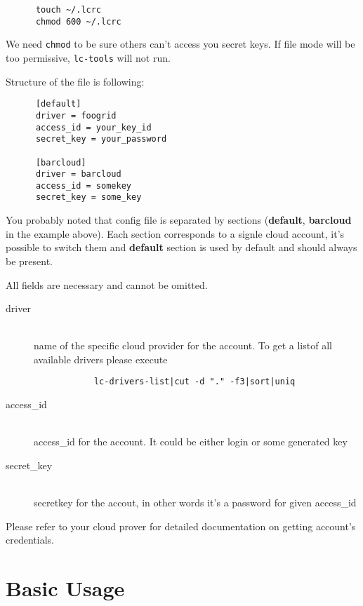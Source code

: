 \documentclass[a4paper]{report}
\begin{document}
      \begin{verbatim}
      touch ~/.lcrc
      chmod 600 ~/.lcrc
      \end{verbatim}

      We need {\tt chmod} to be sure others can't access you secret keys. If file mode
      will be too permissive, {\tt lc-tools} will not run.

      Structure of the file is following:

      \begin{verbatim}
      [default]
      driver = foogrid
      access_id = your_key_id
      secret_key = your_password

      [barcloud]
      driver = barcloud
      access_id = somekey
      secret_key = some_key
      \end{verbatim}

      You probably noted that config file is separated by sections (\textbf{default},
      \textbf{barcloud} in the example above). Each section corresponds to a signle
      cloud account, it's possible to switch them and \textbf{default} section is
      used by default and should always be present.

      All fields are necessary and cannot be omitted.

      \begin{description}
        \item[driver] \hfill \\
          name of the specific cloud provider for the account. To get a listof all
          available drivers please execute

          \begin{verbatim}
            lc-drivers-list|cut -d "." -f3|sort|uniq
          \end{verbatim}

        \item[access\_id] \hfill \\
          access\_id for the account. It could be either login or some generated key
        \item[secret\_key] \hfill \\
          secretkey for the accout, in other words it's a password for given access\_id
      \end{description}

      Please refer to your cloud prover for detailed documentation on getting account's
      credentials.

      \section{Basic Usage}
\end{document}
